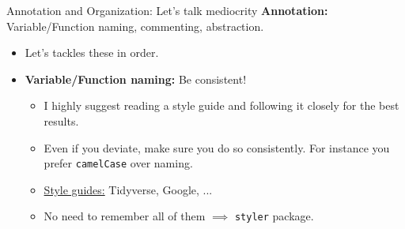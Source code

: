 \documentclass[aspectratio=169,xcolor=dvipsnames]{beamer}
\begin{document}

\begin{frame}[t]{Annotation and Organization: Let's talk mediocrity}
  \textbf{Annotation:} \pause Variable/Function naming, commenting, abstraction.\pause
  \begin{itemize}
    \item Let's tackles these in order.\pause
    \item \textbf{Variable/Function naming:} \alert{Be consistent}!\pause
    \begin{itemize}
      \item I highly suggest reading a \alert{style guide} and following it closely for the best results.\pause
      \item Even if you deviate, make sure you do so consistently. For instance you prefer \texttt{camelCase} over  naming.\pause
      \item \underline{Style guides:} Tidyverse, Google, ...\pause
      \item No need to remember all of them $\implies$ \texttt{styler} package.
    \end{itemize}

  \end{itemize}
\end{frame}

\end{document}
